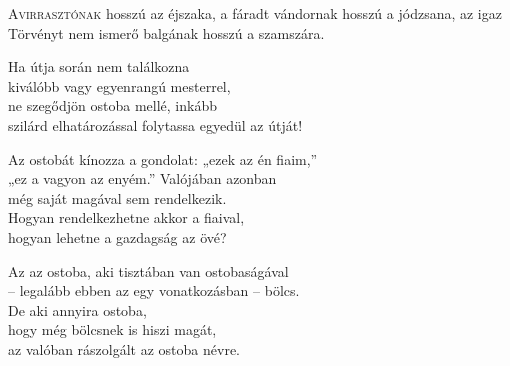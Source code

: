 
\vspace*{-2\baselineskip}

\begin{firstdhpverse}[-2pt]{60}
\lettrine[slope=0.5em]{A}{virrasztónak} {\LettrineTextFont hosszú az éjszaka,}\newline
a fáradt vándornak hosszú a jódzsana,\newline
az igaz Törvényt nem ismerő\newline
balgának hosszú a szamszára.
\end{firstdhpverse}

\begin{dhpverse}

 Ha útja során nem találkozna\\
kiválóbb vagy egyenrangú mesterrel,\\
ne szegődjön ostoba mellé, inkább\\
szilárd elhatározással folytassa egyedül az útját!

 Az ostobát kínozza a gondolat: „ezek az én fiaim,”\\
„ez a vagyon az enyém.” Valójában azonban\\
még saját magával sem rendelkezik.\\
Hogyan rendelkezhetne akkor a fiaival,\\
hogyan lehetne a gazdagság az övé?

 Az az ostoba, aki tisztában van ostobaságával\\
– legalább ebben az egy vonatkozásban – bölcs.\\
De aki annyira ostoba,\\
hogy még bölcsnek is hiszi magát,\\
az valóban rászolgált az ostoba névre.

\end{dhpverse}
\newpage

